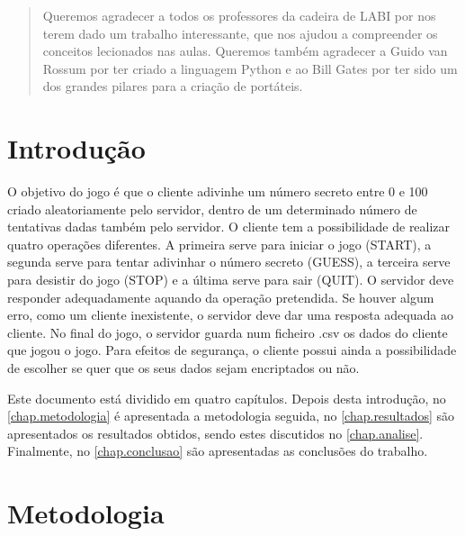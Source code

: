 \documentclass{report}
\begin{document}
\renewcommand{\abstractname}{Agradecimentos}
\begin{abstract}
Queremos agradecer a todos os professores da cadeira de LABI por nos terem dado um trabalho interessante, que nos ajudou a
compreender os conceitos lecionados nas aulas. Queremos também agradecer a Guido van Rossum por ter criado a linguagem Python
e ao Bill Gates por ter sido um dos grandes pilares para a criação de portáteis.

\end{abstract}


\tableofcontents


\clearpage
{}

\chapter{Introdução}
\label{chap.introducao}

O objetivo do jogo é que o cliente adivinhe um número secreto entre 0 e 100 criado 
aleatoriamente pelo servidor, dentro de um determinado número de tentativas dadas também
pelo servidor. O cliente tem a possibilidade de realizar quatro operações diferentes. A primeira
serve para iniciar o jogo (START), a segunda serve para tentar adivinhar o número secreto (GUESS), 
a terceira serve para desistir do jogo (STOP) e a última serve para sair (QUIT). O servidor deve responder
adequadamente aquando da operação pretendida. Se houver algum erro, como um cliente inexistente, o 
servidor deve dar uma resposta adequada ao cliente. No final do jogo, o servidor guarda num ficheiro
.csv os dados do cliente que jogou o jogo. Para efeitos de segurança, o cliente possui ainda a
possibilidade de escolher se quer que os seus dados sejam encriptados ou não.

Este documento está dividido em quatro capítulos.
Depois desta introdução,
no \autoref{chap.metodologia} é apresentada a metodologia seguida,
no \autoref{chap.resultados} são apresentados os resultados obtidos,
sendo estes discutidos no \autoref{chap.analise}.
Finalmente, no \autoref{chap.conclusao} são apresentadas
as conclusões do trabalho.


\chapter{Metodologia}
\label{chap.metodologia}
\end{document}
